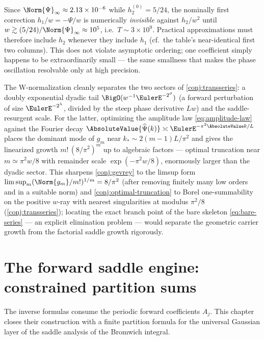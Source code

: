 \documentclass[11pt,oneside]{article}
\numberwithin{equation}{section}
\theoremstyle{definition}
\theoremstyle{remark}
\newcommand{\Psihat}{\widehat\Psi}
\begin{document}
\begin{remark}
Since $\Norm{\Psi}_\infty\approx2.13\times10^{-6}$ while
$h_2^{(0)}=5/24$, the nominally first correction $h_1/w=-\Psi/w$ is
numerically \emph{invisible} against $h_2/w^{2}$ until
$w\gtrsim(5/24)/\Norm{\Psi}_\infty\approx10^{5}$, i.e.\
$T\sim3\times10^{9}$.  Practical approximations must therefore
include $h_2$ whenever they include $h_1$
(cf.\ the table's near-identical first two columns).  This does not
violate asymptotic ordering; one coefficient simply happens to be
extraordinarily small --- the same smallness that makes the phase
oscillation resolvable only at high precision.
\end{remark}

\begin{remark}
The W-normalization cleanly separates the two sectors of
\cref{conj:transseries}: a doubly exponential dyadic tail
$\BigO(w^{-1}\EulerE^{-2^{\vartheta}})$ (a forward perturbation of size
$\EulerE^{-2^{\lambda}}$, divided by the steep phase derivative $Lw$) and
the saddle-resurgent scale.  For the latter, optimizing the
amplitude law \eqref{eq:amplitude-law} against the Fourier decay
$\AbsoluteValue{\Psihat(k)}\asymp\EulerE^{-\pi^{2}\AbsoluteValue k/L}$ places the dominant
mode of $g_m$ near $k_*\sim2(m-1)L/\pi^{2}$ and gives the linearized
growth $m!\,(8/\pi^{2})^{m}$ up to algebraic factors --- optimal
truncation near $m\simeq\pi^{2}w/8$ with remainder scale
$\exp(-\pi^{2}w/8)$, enormously larger than the dyadic sector.  This
sharpens \cref{conj:gevrey} to the limsup form
$\limsup_m(\Norm{g_m}/m!)^{1/m}=8/\pi^{2}$ (after removing finitely
many low orders and in a suitable norm) and
\cref{conj:optimal-truncation} to Borel one-summability on the
positive $w$-ray with nearest singularities at modulus
$\pi^{2}/8$ (\cref{conj:transseries}); locating the exact branch
point of the bare skeleton \eqref{eq:bare-series} --- an explicit
elimination problem --- would separate the geometric carrier growth
from the factorial saddle growth rigorously.
\end{remark}

\section{The forward saddle engine: constrained partition sums}
\label{sec:saddle}

The inverse formulas consume the periodic forward coefficients
$A_j$.  This chapter closes their construction with a finite
partition formula for the universal Gaussian layer of the saddle
analysis of the Bromwich integral.
\end{document}
